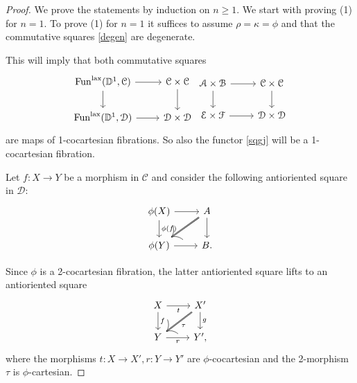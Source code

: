 \documentclass[10pt,oneside]{article}
\numberwithin{equation}{section} %
\numberwithin{figure}{section} %
\theoremstyle{plain}
\theoremstyle{definition}
\newcommand{\bD}{{\mathbb D}}
\newcommand{\mA}{{\mathcal A}}
\newcommand{\mB}{{\mathcal B}}
\newcommand{\mC}{{\mathcal C}}
\newcommand{\mD}{{\mathcal D}}
\newcommand{\mE}{{\mathcal E}}
\newcommand{\mF}{{\mathcal F}}
\newcommand{\Fun}{\mathrm{Fun}}
\newcommand{\lax}{{\mathrm{lax}}}
\begin{document}
\begin{proof}

We prove the statements by induction on $n \geq 1.$
We start with proving (1) for $n=1.$
To prove (1) for $n=1$ it suffices to assume $\rho=\kappa=\phi$
and that the commutative squares \ref{degen} are degenerate.



This will imply that both commutative squares
\[
\begin{tikzcd}
\Fun^\lax(\bD^1,\mC) \ar{d} \ar{r}[swap]{} & \mC \times \mC \ar{d} \\
\Fun^\lax(\bD^1,\mD) \ar{r}[swap]{} & \mD \times \mD
\end{tikzcd}
\begin{tikzcd}
\mA \times \mB \ar{d} \ar{r}[swap]{} & \mC \times \mC \ar{d} \\
\mE \times \mF \ar{r}[swap]{} & \mD \times \mD
\end{tikzcd}
\]
are maps of 1-cocartesian fibrations. So also the functor \ref{sqgj} will be a 1-cocartesian fibration.



Let $f:X \to Y$ be a morphism in $\mC$ and consider the following antioriented square in $\mD:$
\[
\begin{tikzcd}
\phi(X) \ar{d}{\phi(f)} \ar{r}[swap]{} & A \ar[double]{dl}{} \ar{d}{} \\
\phi(Y) \ar{r}[swap]{} & B.
\end{tikzcd}
\]

Since $\phi$ is a 2-cocartesian fibration, the latter antioriented square lifts to an antioriented square 
\[
\begin{tikzcd}
X \ar{d}{f} \ar{r}[swap]{t} & X' \ar[double]{dl}{\tau} \ar{d}{g} \\
Y \ar{r}[swap]{r} & Y',
\end{tikzcd}
\]
where the morphisms $t: X \to X', r: Y \to Y'$ are $\phi$-cocartesian and
the 2-morphism $\tau$ is $\phi$-cartesian.


\end{proof}
\end{document}
